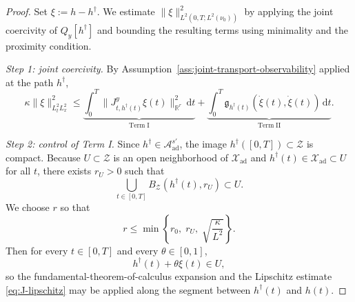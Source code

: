 \documentclass{article}
\theoremstyle{definition}
\renewcommand{\d}{\mathrm{d}}
\begin{document}
\begin{proof}
    Set \(\xi:=h-h^\dagger\). We estimate \(\|\xi\|_{L^2(0,T;L^2(\nu_0))}^2\) by applying the joint
    coercivity of \(Q_y[h^\dagger]\) and bounding the resulting terms using minimality and the
    proximity condition.

    \medskip
    \noindent
    \emph{Step 1: joint coercivity.}
    By Assumption~\ref{ass:joint-transport-observability} applied at the path \(h^\dagger\),
    \begin{equation}
        \label{eq:stab-joint-coercivity}
        \kappa\|\xi\|_{L^2_tL^2_x}^2
        \le
        \underbrace{
        \int_0^T \|J_{t,h^\dagger(t)}^{y}\xi(t)\|_{\mathbb R^r}^2\,\d t
        }_{\mathrm{Term\;I}}
        +
        \underbrace{
            \int_0^T \mathfrak g_{h^\dagger(t)}(\dot\xi(t),\dot\xi(t))\,\d t
        }_{\mathrm{Term\;II}}.
    \end{equation}

    \medskip
    \noindent
    \emph{Step 2: control of Term I.}
    Since \(h^\dagger\in \mathcal A_{\mathrm{ad}}^{s'}\), the image
    \(h^\dagger([0,T])\subset \mathcal Z\) is compact. Because \(U\subset\mathcal Z\) is an open
    neighborhood of \(\mathcal X_{\mathrm{ad}}\) and \(h^\dagger(t)\in\mathcal X_{\mathrm{ad}}\subset U\)
    for all \(t\), there exists \(r_U>0\) such that
    \[
        \bigcup_{t\in[0,T]} B_{\mathcal Z}(h^\dagger(t),r_U)\subset U.
    \]
    We choose \(r\) so that
    \[
        r\le \min\left\{r_0,\;r_U,\;\sqrt{\frac{\kappa}{L^2}}\right\}.
    \]
    Then for every \(t\in[0,T]\) and every \(\theta\in[0,1]\),
    \[
        h^\dagger(t)+\theta\xi(t)\in U,
    \]
    so the fundamental-theorem-of-calculus expansion and the Lipschitz estimate
    \eqref{eq:J-lipschitz} may be applied along the segment between
    \(h^\dagger(t)\) and \(h(t)\).


\end{proof}
\end{document}

